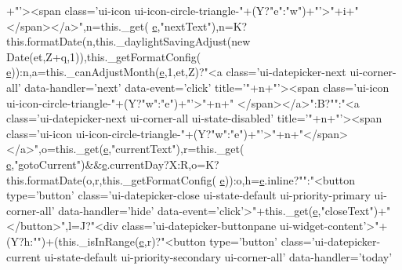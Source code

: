 \begin{DoxyCode}
      +\textcolor{stringliteral}{"'><span class='ui-icon ui-icon-circle-triangle-"}+(Y?\textcolor{stringliteral}{"e"}:\textcolor{stringliteral}{"w"})+\textcolor{stringliteral}{"'>"}+i+\textcolor{stringliteral}{"</span></a>"},n=this.\_get(
      \hyperlink{jquery-ui_8min_8js_a2c038346d47955cbe2cb91e338edd7e1}{e},\textcolor{stringliteral}{"nextText"}),n=K?this.formatDate(n,this.\_daylightSavingAdjust(new Date(et,Z+q,1)),this.\_getFormatConfig(
      \hyperlink{jquery-ui_8min_8js_a2c038346d47955cbe2cb91e338edd7e1}{e})):n,a=this.\_canAdjustMonth(\hyperlink{jquery-ui_8min_8js_a2c038346d47955cbe2cb91e338edd7e1}{e},1,et,Z)?\textcolor{stringliteral}{"<a class='ui-datepicker-next ui-corner-all' data-handler='next'
       data-event='click' title='"}+n+\textcolor{stringliteral}{"'><span class='ui-icon ui-icon-circle-triangle-"}+(Y?\textcolor{stringliteral}{"w"}:\textcolor{stringliteral}{"e"})+\textcolor{stringliteral}{"'>"}+n+\textcolor{stringliteral}{"
      </span></a>"}:B?\textcolor{stringliteral}{""}:\textcolor{stringliteral}{"<a class='ui-datepicker-next ui-corner-all ui-state-disabled' title='"}+n+\textcolor{stringliteral}{"'><span class='ui-icon
       ui-icon-circle-triangle-"}+(Y?\textcolor{stringliteral}{"w"}:\textcolor{stringliteral}{"e"})+\textcolor{stringliteral}{"'>"}+n+\textcolor{stringliteral}{"</span></a>"},o=this.\_get(\hyperlink{jquery-ui_8min_8js_a2c038346d47955cbe2cb91e338edd7e1}{e},\textcolor{stringliteral}{"currentText"}),r=this.\_get(
      \hyperlink{jquery-ui_8min_8js_a2c038346d47955cbe2cb91e338edd7e1}{e},\textcolor{stringliteral}{"gotoCurrent"})&&\hyperlink{jquery-ui_8min_8js_a2c038346d47955cbe2cb91e338edd7e1}{e}.currentDay?X:R,o=K?this.formatDate(o,r,this.\_getFormatConfig(
      \hyperlink{jquery-ui_8min_8js_a2c038346d47955cbe2cb91e338edd7e1}{e})):o,h=\hyperlink{jquery-ui_8min_8js_a2c038346d47955cbe2cb91e338edd7e1}{e}.inline?\textcolor{stringliteral}{""}:\textcolor{stringliteral}{"<button type='button' class='ui-datepicker-close ui-state-default
       ui-priority-primary ui-corner-all' data-handler='hide' data-event='click'>"}+this.\_get(\hyperlink{jquery-ui_8min_8js_a2c038346d47955cbe2cb91e338edd7e1}{e},\textcolor{stringliteral}{"closeText"})+\textcolor{stringliteral}{"</button>"},l=J?\textcolor{stringliteral}{"<div
       class='ui-datepicker-buttonpane ui-widget-content'>"}+(Y?h:\textcolor{stringliteral}{""})+(this.\_isInRange(\hyperlink{jquery-ui_8min_8js_a2c038346d47955cbe2cb91e338edd7e1}{e},r)?\textcolor{stringliteral}{"<button type='button'
       class='ui-datepicker-current ui-state-default ui-priority-secondary ui-corner-all' data-handler='today'
}
\end{DoxyCode}
